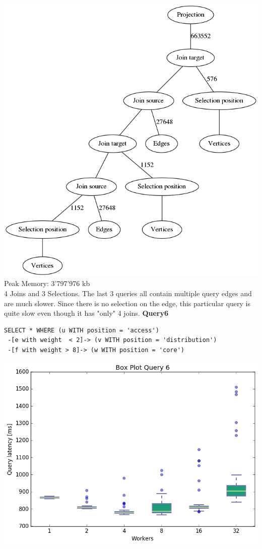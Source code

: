 \documentclass[11pt,singlecolumn]{scrartcl}
\begin{document}
\includegraphics[width=1\textwidth]{graph5}
Peak Memory: 3'797'976 kb \\
4 Joins and 3 Selections. The last 3 queries all contain multiple query edges and are much slower. Since there is no selection on the edge, this particular query is quite slow even though it has "only" 4 joins.
\clearpage
\textbf{Query6}\\
\begin{verbatim}
SELECT * WHERE (u WITH position = 'access')
 -[e with weight  < 2]-> (v WITH position = 'distribution')
 -[f with weight > 8]-> (w WITH position = 'core')\end{verbatim}
\includegraphics[width=1\textwidth]{box/q6}
\end{document}
